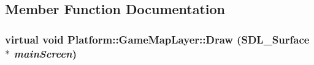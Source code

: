 \subsection{Member Function Documentation}
\hypertarget{class_platform_1_1_game_map_layer_8f800165e53a408dfad459f3533ed0a9}{
\subsubsection[{Draw}]{\setlength{\rightskip}{0pt plus 5cm}virtual void Platform::GameMapLayer::Draw (SDL\_\-Surface $\ast$ {\em mainScreen})}}
\label{d8/d53/class_platform_1_1_game_map_layer_8f800165e53a408dfad459f3533ed0a9}


